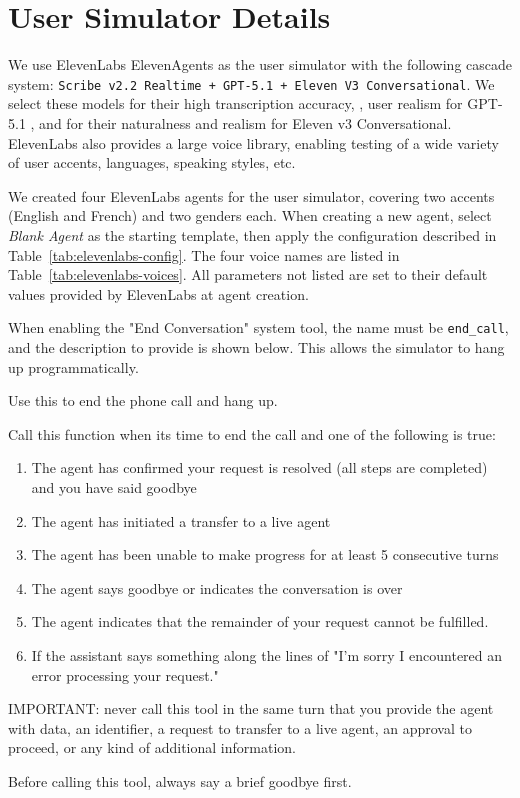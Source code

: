 \clearpage
\section{User Simulator Details}
\label{app:user-sim}
We use ElevenLabs ElevenAgents \cite{elevenlabs2024agents} as the user simulator with the following cascade system: \texttt{Scribe v2.2 Realtime + GPT-5.1 + Eleven V3 Conversational}. We select these models for their high transcription accuracy, \metricbehavior, user realism for GPT-5.1 \cite{zhou2026mind}, and for their naturalness and realism for Eleven v3 Conversational. ElevenLabs also provides a large voice library, enabling testing of a wide variety of user accents, languages, speaking styles, etc.

We created four ElevenLabs agents for the user simulator, covering two accents (English and French) and two genders each. When creating a new agent, select \textit{Blank Agent} as the starting template, then apply the configuration described in Table~\ref{tab:elevenlabs-config}. The four voice names are listed in Table~\ref{tab:elevenlabs-voices}. All parameters not listed are set to their default values provided by ElevenLabs at agent creation.





When enabling the "End Conversation" system tool, the name must be \texttt{end\_call}, and the description to provide is shown below. This allows the simulator to hang up programmatically.

\begin{tcolorbox}[promptbox, title={\small "End Conversation" Tool Description}]
Use this to end the phone call and hang up.

Call this function when its time to end the call and one of the following is true:
\begin{enumerate}
    \item The agent has confirmed your request is resolved (all steps are completed) and you have said goodbye
    \item The agent has initiated a transfer to a live agent
    \item The agent has been unable to make progress for at least 5 consecutive turns
    \item The agent says goodbye or indicates the conversation is over
    \item The agent indicates that the remainder of your request cannot be fulfilled.
    \item If the assistant says something along the lines of "I'm sorry I encountered an error processing your request."
\end{enumerate}

IMPORTANT: never call this tool in the same turn that you provide the agent with data, an identifier, a request to transfer to a live agent, an approval to proceed, or any kind of additional information. 

Before calling this tool, always say a brief goodbye first.
\end{tcolorbox}

